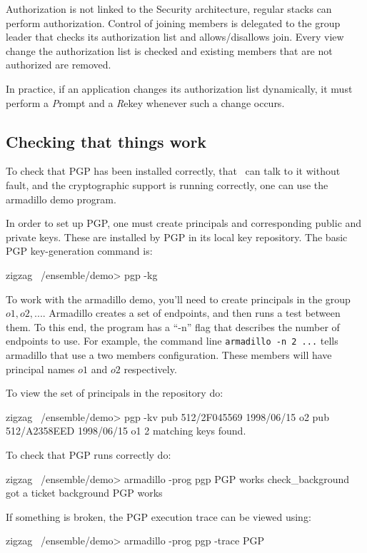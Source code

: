 Authorization is not linked to the Security architecture, regular
stacks can perform authorization. Control of joining members is
delegated to the group leader that checks its authorization list and
allows/disallows join. Every view change the authorization list is checked and
existing members that are not authorized are removed. 

In practice, if an application changes its authorization list
dynamically, it must perform a {\emph Prompt} and a {\emph Rekey}
whenever such a change occurs.

\subsection{Checking that things work}
To check that PGP has been installed correctly, that \ensemble\ can
talk to it without fault, and the cryptographic support is running
correctly, one can use the armadillo demo program. 

In order to set up PGP, one must create principals and corresponding
public and private keys. These are installed by PGP in its local
key repository. The basic PGP key-generation command is:
\begin{codebox}
zigzag ~/ensemble/demo> pgp -kg
\end{codebox}

To work with the armadillo demo, you'll need to create principals in
the group $o1, o2, ...$. Armadillo creates a set of endpoints, and
then runs a test between them. To this end, the program has a ``-n''
flag that describes the number of endpoints to use. For example, the
command line {\tt armadillo -n 2 ...} tells armadillo that use a two
members configuration. These members will have principal names $o1$
and $o2$ respectively.

To view the set of principals in the repository do:
\begin{codebox}
zigzag ~/ensemble/demo> pgp -kv
pub   512/2F045569 1998/06/15 o2
pub   512/A2358EED 1998/06/15 o1
2 matching keys found.
\end{codebox}

To check that PGP runs correctly do: 
\begin{codebox}
zigzag ~/ensemble/demo> armadillo -prog pgp 
PGP works
check_background
got a ticket
background PGP works
\end{codebox}

If something is broken, the PGP execution trace can be viewed using:
\begin{codebox}
zigzag ~/ensemble/demo> armadillo -prog pgp  -trace PGP 
\end{codebox}

